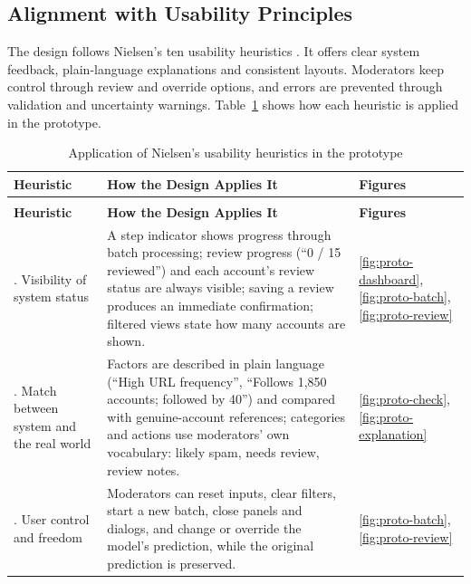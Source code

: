 \subsection{Alignment with Usability Principles}\label{sec:usability}

The design follows Nielsen's ten usability heuristics \parencite{nielsen1994heuristics}. It offers clear system feedback, plain-language explanations and consistent layouts. Moderators keep control through review and override options, and errors are prevented through validation and uncertainty warnings. Table~\ref{tab:heuristics} shows how each heuristic is applied in the prototype.

{\renewcommand{\arraystretch}{1.2}\small
\begin{longtable}{@{}>{\raggedright\arraybackslash}p{} >{\raggedright\arraybackslash}p{} >{\raggedright\arraybackslash}p{}@{}}
  \caption{Application of Nielsen's usability heuristics in the prototype}\label{tab:heuristics} \\
  \toprule
  \textbf{Heuristic} & \textbf{How the Design Applies It} & \textbf{Figures} \\
  \midrule
  \endfirsthead
  \multicolumn{3}{@{}l}{\small\itshape Table~\thetable{} continued} \\
  \toprule
  \textbf{Heuristic} & \textbf{How the Design Applies It} & \textbf{Figures} \\
  \midrule
  \endhead
  \bottomrule
  \endlastfoot
  1. Visibility of system status & A step indicator shows progress through batch processing; review progress (\enquote{0 / 15 reviewed}) and each account's review status are always visible; saving a review produces an immediate confirmation; filtered views state how many accounts are shown. & \ref{fig:proto-dashboard}, \ref{fig:proto-batch}, \ref{fig:proto-review} \\
  2. Match between system and the real world & Factors are described in plain language (\enquote{High URL frequency}, \enquote{Follows 1,850 accounts; followed by 40}) and compared with genuine-account references; categories and actions use moderators' own vocabulary: likely spam, needs review, review notes. & \ref{fig:proto-check}, \ref{fig:proto-explanation} \\
  3. User control and freedom & Moderators can reset inputs, clear filters, start a new batch, close panels and dialogs, and change or override the model's prediction, while the original prediction is preserved. & \ref{fig:proto-batch}, \ref{fig:proto-review} \\

\end{longtable}}
